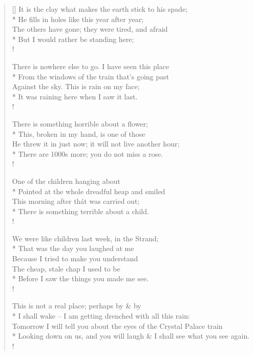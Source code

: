 \documentclass[MAIN]{subfiles}
\begin{document}
\settowidth{\versewidth}{It is the clay what makes the earth stick to his spade;}
\begin{verse}[\versewidth]
It is the clay what makes the earth stick to his spade;\\*
\vin He fills in holes like this year after year;\\
The others have gone; they were tired, and  afraid\\*
\vin But I would rather be standing here;\\!

There is nowhere else to go. I have seen this place\\*
\vin From the windows of the train that's going past\\
Against the sky. This is rain on my face;\\*
\vin It was raining here when I saw it last.\\!

There is something horrible about a flower;\\*
\vin This, broken in my hand, is one of those\\
He threw it in just now; it will not live another hour;\\*
\vin There are 1000s more; you do not miss a rose.\\!

One of the children hanging about\\*
\vin Pointed at the whole dreadful heap and smiled\\
This morning after th\'at was carried out;\\*
\vin There is something terrible about a child.\\!

We were like children last week, in the {\sc Strand};\\*
\vin That was the day you laughed at me\\
Because I tried to make you understand\\
\vin The cheap, stale chap I used to be\\*
\vin Before I saw the things you made me see.\\!

This is not a real place; perhaps by \& by\\*
\vin I shall wake -- I am getting drenched with all this rain:\\
Tomorrow I will tell you about the eyes of the {\sc Crystal Palace} train\\*
\vin Looking down on us, and you will laugh \& I shall see what you see again.\\!


\end{verse}
\end{document}
